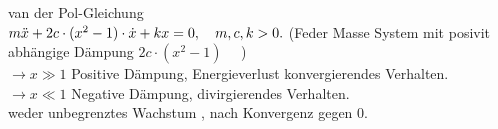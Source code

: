 \documentclass[11pt,a4paper]{article}
\begin{document}
\begin{enumerate}[(A)]
\begin{itemize}
van der Pol-Gleichung\\
$m\ddot{x} + 2c\cdot (x^2 -1)\cdot \dot{x} + k x = 0, \quad m,c,k > 0. \\$
(Feder Masse System mit posivit abhängige Dämpung $2c\cdot (x^2 - 1)$ ~~)\\
$\rightarrow x\gg 1 $ Positive Dämpung, Energieverlust konvergierendes Verhalten.\\
$\rightarrow x\ll 1 $ Negative Dämpung, divirgierendes Verhalten.  \\
weder unbegrenztes Wachstum , nach Konvergenz gegen 0.
\begin{figure}[H]  
  \centering
  \def\svgwidth{200pt} 
   
\end{figure} 
\end{itemize}
\end{enumerate}
\end{document}
